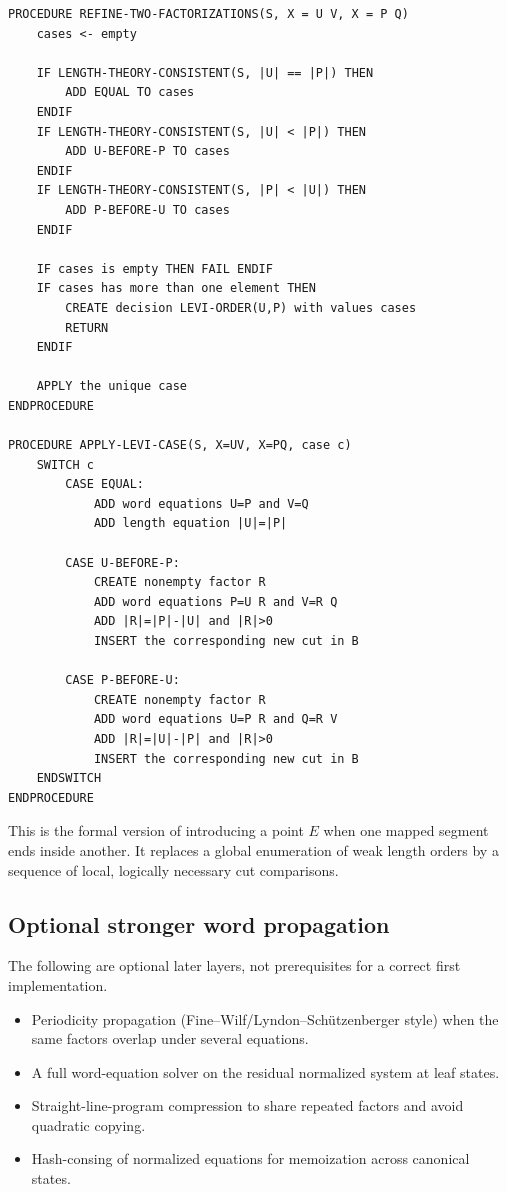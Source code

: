 \documentclass[11pt]{article}
\begin{document}
\begin{lstlisting}[caption={Levi refinement of competing cuts.},label={alg:levi}]
PROCEDURE REFINE-TWO-FACTORIZATIONS(S, X = U V, X = P Q)
    cases <- empty

    IF LENGTH-THEORY-CONSISTENT(S, |U| == |P|) THEN
        ADD EQUAL TO cases
    ENDIF
    IF LENGTH-THEORY-CONSISTENT(S, |U| < |P|) THEN
        ADD U-BEFORE-P TO cases
    ENDIF
    IF LENGTH-THEORY-CONSISTENT(S, |P| < |U|) THEN
        ADD P-BEFORE-U TO cases
    ENDIF

    IF cases is empty THEN FAIL ENDIF
    IF cases has more than one element THEN
        CREATE decision LEVI-ORDER(U,P) with values cases
        RETURN
    ENDIF

    APPLY the unique case
ENDPROCEDURE

PROCEDURE APPLY-LEVI-CASE(S, X=UV, X=PQ, case c)
    SWITCH c
        CASE EQUAL:
            ADD word equations U=P and V=Q
            ADD length equation |U|=|P|

        CASE U-BEFORE-P:
            CREATE nonempty factor R
            ADD word equations P=U R and V=R Q
            ADD |R|=|P|-|U| and |R|>0
            INSERT the corresponding new cut in B

        CASE P-BEFORE-U:
            CREATE nonempty factor R
            ADD word equations U=P R and Q=R V
            ADD |R|=|U|-|P| and |R|>0
            INSERT the corresponding new cut in B
    ENDSWITCH
ENDPROCEDURE
\end{lstlisting}

This is the formal version of introducing a point $E$ when one mapped segment ends inside another.  It replaces a global enumeration of weak length orders by a sequence of local, logically necessary cut comparisons.

\subsection{Optional stronger word propagation}

The following are optional later layers, not prerequisites for a correct first implementation.
\begin{itemize}
  \item Periodicity propagation (Fine--Wilf/Lyndon--Sch\"utzenberger style) when the same factors overlap under several equations.
  \item A full word-equation solver on the residual normalized system at leaf states.
  \item Straight-line-program compression to share repeated factors and avoid quadratic copying.
  \item Hash-consing of normalized equations for memoization across canonical states.
\end{itemize}
\end{document}

